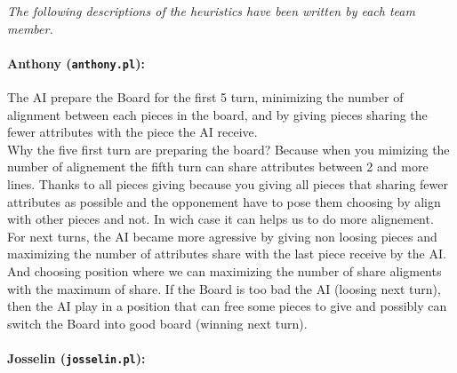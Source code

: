 \documentclass[a4paper,11pt]{article}
\newcommand{\tw}[1]{\texttt{#1}}
\begin{document}
		\textit{The following descriptions of the heuristics have been written by each team member.}
		
		\paragraph{Anthony (\tw{anthony.pl}):} The AI prepare the Board for the first 5 turn, minimizing the number of alignment between each pieces in the board, and by giving pieces sharing the fewer attributes with the piece the AI receive. \\
		Why the five first turn are preparing the board? Because when you mimizing the number of alignement the fifth turn can share attributes between 2 and more lines. Thanks to all pieces giving because you giving all pieces that sharing fewer attributes as possible and the opponement have to pose them choosing by align with other pieces and not. In wich case it can helps us to do more alignement. \\
		For next turns, the AI became more agressive by giving non loosing pieces and maximizing the number of attributes share with the last piece receive by the AI. And choosing position where we can maximizing the number of share aligments with the maximum of share. If the Board is too bad the AI (loosing next turn), then the AI play in a position that can free some pieces to give and possibly can switch the Board into good board (winning next turn).

		\paragraph{Josselin (\tw{josselin.pl}):} 
\end{document}
